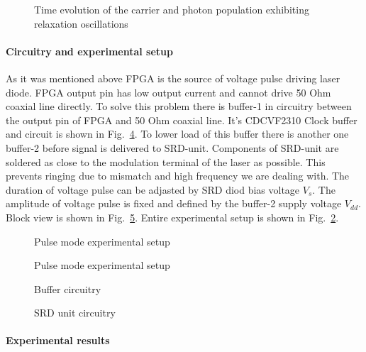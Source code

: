 \begin{figure}
  \centering
  \caption{Time evolution of the carrier and photon population
    exhibiting relaxation oscillations}
  \label{fig:LasPRelaxOsc}
\end{figure}


\paragraph{Circuitry and experimental setup}
 
As it was mentioned above FPGA is the source of voltage pulse driving
laser diode.  FPGA output pin has low output current and cannot drive
50 Ohm coaxial line directly.  To solve this problem there is buffer-1
in circuitry between the output pin of FPGA and 50 Ohm coaxial
line. It's CDCVF2310 Clock buffer and circuit is shown in
Fig.~\ref{fig:LasPBuf}.  To lower load of this buffer there is another
one buffer-2 before signal is delivered to SRD-unit.  Components of
SRD-unit are soldered as close to the modulation terminal of the laser
as possible. This prevents ringing due to mismatch and high frequency
we are dealing with. The duration of voltage pulse can be adjasted by
SRD diod bias voltage $V_s$. The amplitude of voltage pulse is fixed
and defined by the buffer-2 supply voltage $V_{dd}$.  Block view is
shown in Fig.~\ref{fig:LasPSRDunit}. Entire experimental setup is
shown in Fig.~\ref{fig:LasPSetup}.

\begin{figure}[!hbt]
  \centering
  \caption{Pulse mode experimental setup}
  \label{fig:LasPSetup}
\end{figure}

\begin{figure}
  \centering
  \caption{Pulse mode experimental setup}
  \label{fig:LasPSetp}
\end{figure}

\begin{figure}
  \centering
  \caption{Buffer circuitry}
  \label{fig:LasPBuf}
\end{figure}

\begin{figure}
  \centering
  \caption{SRD unit circuitry}
  \label{fig:LasPSRDunit}
\end{figure}


\paragraph{Experimental results}

